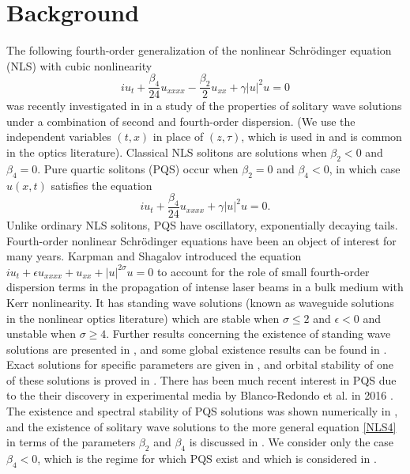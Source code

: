 \documentclass[12pt]{elsarticle}
\begin{document}
\section{Background}

The following fourth-order generalization of the nonlinear Schr{\"o}dinger equation (NLS) with cubic nonlinearity
\begin{equation}\label{NLS4}
i u_t + \frac{\beta_4}{24}u_{xxxx} - \frac{\beta_2}{2}u_{xx} + \gamma |u|^2 u = 0
\end{equation}
was recently investigated in \cite{Tam2020} in a study of the properties of solitary wave solutions under a combination of second and fourth-order dispersion. (We use the independent variables $(t, x)$ in place of $(z, \tau)$, which is used in \cite{BlancoPQS,Tam2019,Tam2020} and is common in the optics literature). Classical NLS solitons are solutions when $\beta_2 < 0$ and $\beta_4 = 0$. Pure quartic solitons (PQS) occur when $\beta_2 = 0$ and $\beta_4 < 0$, in which case $u(x,t)$ satisfies the equation
\begin{equation}\label{PQSeq}
i u_t + \frac{\beta_4}{24}u_{xxxx} + \gamma |u|^2 u = 0.
\end{equation}
Unlike ordinary NLS solitons, PQS have oscillatory, exponentially decaying tails. Fourth-order nonlinear Schr{\"o}dinger equations have been an object of interest for many years. Karpman and Shagalov \cite{Karpman1996,Karpman1997,Karpman2000} introduced the equation $i u_t + \epsilon u_{xxxx} + u_{xx} + |u|^{2 \sigma}u = 0$ to account for the role of small fourth-order dispersion terms in the propagation of intense laser beams in a bulk medium with Kerr nonlinearity. It has standing wave solutions (known as waveguide solutions in the nonlinear optics literature) which are stable when $\sigma \leq 2$ and $\epsilon < 0$ and unstable when $\sigma \geq 4$. Further results concerning the existence of standing wave solutions are presented in \cite{Bonheure2014,Bonheure2018}, and some global existence results can be found in \cite{Ilan-2002,Shangbi-2007,Pausader2009}. Exact solutions for specific parameters are given in \cite{AbdulMaji2006,KarllsonHook}, and orbital stability of one of these solutions is proved in \cite{Natali2015}. There has been much recent interest in PQS due to the their discovery in experimental media by Blanco-Redondo et al. in 2016 \cite{BlancoPQS}. The existence and spectral stability of PQS solutions was shown numerically in \cite{Tam2019}, and the existence of solitary wave solutions to the more general equation \cref{NLS4} in terms of the parameters $\beta_2$ and $\beta_4$ is discussed in \cite{Tam2020}. We consider only the case $\beta_4 < 0$, which is the regime for which PQS exist \cite{Tam2019} and which is considered in \cite{Tam2020}.
\end{document}
